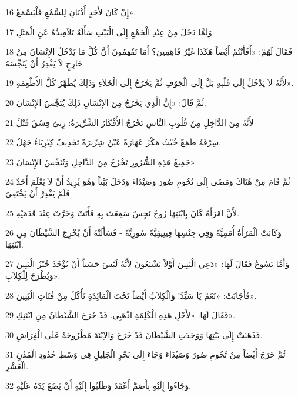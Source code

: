 \par 16 إِنْ كَانَ لأَحَدٍ أُذْنَانِ لِلسَّمْعِ فَلْيَسْمَعْ».
\par 17 وَلَمَّا دَخَلَ مِنْ عِنْدِ الْجَمْعِ إِلَى الْبَيْتِ سَأَلَهُ تَلاَمِيذُهُ عَنِ الْمَثَلِ.
\par 18 فَقَالَ لَهُمْ: «أَفَأَنْتُمْ أَيْضاً هَكَذَا غَيْرُ فَاهِمِينَ؟ أَمَا تَفْهَمُونَ أَنَّ كُلَّ مَا يَدْخُلُ الإِنْسَانَ مِنْ خَارِجٍ لاَ يَقْدِرُ أَنْ يُنَجِّسَهُ
\par 19 لأَنَّهُ لاَ يَدْخُلُ إِلَى قَلْبِهِ بَلْ إِلَى الْجَوْفِ ثُمَّ يَخْرُجُ إِلَى الْخَلاَءِ وَذَلِكَ يُطَهِّرُ كُلَّ الأَطْعِمَةِ».
\par 20 ثُمَّ قَالَ: «إِنَّ الَّذِي يَخْرُجُ مِنَ الإِنْسَانِ ذَلِكَ يُنَجِّسُ الإِنْسَانَ.
\par 21 لأَنَّهُ مِنَ الدَّاخِلِ مِنْ قُلُوبِ النَّاسِ تَخْرُجُ الأَفْكَارُ الشِّرِّيرَةُ: زِنىً فِسْقٌ قَتْلٌ
\par 22 سِرْقَةٌ طَمَعٌ خُبْثٌ مَكْرٌ عَهَارَةٌ عَيْنٌ شِرِّيرَةٌ تَجْدِيفٌ كِبْرِيَاءُ جَهْلٌ.
\par 23 جَمِيعُ هَذِهِ الشُّرُورِ تَخْرُجُ مِنَ الدَّاخِلِ وَتُنَجِّسُ الإِنْسَانَ».
\par 24 ثُمَّ قَامَ مِنْ هُنَاكَ وَمَضَى إِلَى تُخُومِ صُورَ وَصَيْدَاءَ وَدَخَلَ بَيْتاً وَهُوَ يُرِيدُ أَنْ لاَ يَعْلَمَ أَحَدٌ فَلَمْ يَقْدِرْ أَنْ يَخْتَفِيَ
\par 25 لأَنَّ امْرَأَةً كَانَ بِابْنَتِهَا رُوحٌ نَجِسٌ سَمِعَتْ بِهِ فَأَتَتْ وَخَرَّتْ عِنْدَ قَدَمَيْهِ.
\par 26 وَكَانَتْ الْمَرْأَةُ أُمَمِيَّةً وَفِي جِنْسِهَا فِينِيقِيَّةً سُورِيَّةً - فَسَأَلَتْهُ أَنْ يُخْرِجَ الشَّيْطَانَ مِنِ ابْنَتِهَا.
\par 27 وَأَمَّا يَسُوعُ فَقَالَ لَهَا: «دَعِي الْبَنِينَ أَوَّلاً يَشْبَعُونَ لأَنَّهُ لَيْسَ حَسَناً أَنْ يُؤْخَذَ خُبْزُ الْبَنِينَ وَيُطْرَحَ لِلْكِلاَبِ».
\par 28 فَأَجَابَتْ: «نَعَمْ يَا سَيِّدُ! وَالْكِلاَبُ أَيْضاً تَحْتَ الْمَائِدَةِ تَأْكُلُ مِنْ فُتَاتِ الْبَنِينَ».
\par 29 فَقَالَ لَهَا: «لأَجْلِ هَذِهِ الْكَلِمَةِ اذْهَبِي. قَدْ خَرَجَ الشَّيْطَانُ مِنِ ابْنَتِكِ».
\par 30 فَذَهَبَتْ إِلَى بَيْتِهَا وَوَجَدَتِ الشَّيْطَانَ قَدْ خَرَجَ وَالاِبْنَةَ مَطْرُوحَةً عَلَى الْفِرَاشِ.
\par 31 ثُمَّ خَرَجَ أَيْضاً مِنْ تُخُومِ صُورَ وَصَيْدَاءَ وَجَاءَ إِلَى بَحْرِ الْجَلِيلِ فِي وَسْطِ حُدُودِ الْمُدُنِ الْعَشْرِ.
\par 32 وَجَاءُوا إِلَيْهِ بِأَصَمَّ أَعْقَدَ وَطَلَبُوا إِلَيْهِ أَنْ يَضَعَ يَدَهُ عَلَيْهِ.
